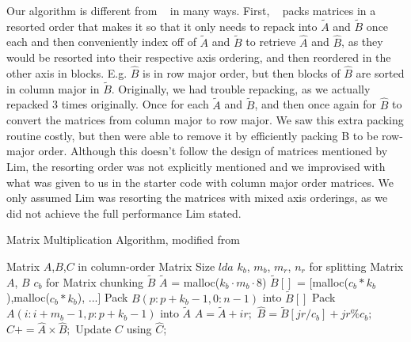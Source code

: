 \documentclass{article}
\begin{document}
Our algorithm is different from ~\cite{10.1007/s10586-018-2810-y} in many ways. First, ~\cite{10.1007/s10586-018-2810-y} packs matrices in a resorted order that makes it so that it only needs to repack into $\tilde{A}$ and $\tilde{B}$ once each and then conveniently index off of $\tilde{A}$ and $\tilde{B}$ to retrieve $\hat{A}$ and $\hat{B}$, as they would be resorted into their respective axis ordering, and then reordered in the other axis in blocks. E.g. $\hat{B}$ is in row major order, but then blocks of $\hat{B}$ are sorted in column major in $\tilde{B}$. Originally, we had trouble repacking, as we actually repacked 3 times originally. Once for each $\tilde{A}$ and $\tilde{B}$, and then once again for $\hat{B}$ to convert the matrices from column major to row major. We saw this extra packing routine costly, but then were able to remove it by efficiently packing B to be row-major order. Although this doesn't follow the design of matrices mentioned by Lim, the resorting order was not explicitly mentioned and we improvised with what was given to us in the starter code with column major order matrices. We only assumed Lim was resorting the matrices with mixed axis orderings, as we did not achieve the full performance Lim stated.

\begin{algorithm}[H]
\label{alg:algorithm1}
\caption{Matrix Multiplication Algorithm, modified from ~\cite{10.1007/s10586-018-2810-y}}
\begin{algorithmic}
    \REQUIRE Matrix $A$,$B$,$C$ in  column-order
    \REQUIRE Matrix Size $lda$
    \REQUIRE $k_b$, $m_b$, $m_r$, $n_r$ for splitting Matrix $A$, $B$ 
    \REQUIRE $c_b$ for Matrix chunking $\tilde{B}$
    \State $\tilde{A}$ = malloc($k_b \cdot m_b \cdot 8$)
    \State $\tilde{B}[]$ = [malloc($c_b * k_b$),malloc($c_b * k_b$), ...] 
        \State Pack $B(p : p + k_b - 1, 0: n - 1)$ into $\tilde{B}[]$ 
            \State Pack $A(i : i + m_b - 1, p: p + k_b - 1)$ into $\tilde{A}$ 
                    \State $\hat{A} = \tilde{A} + ir;$
                    \State $\hat{B} = \tilde{B}[jr/c_b] + jr\%c_b;$
                    \State $\hat{C} += \hat{A}\times\hat{B};$ 
                    \State Update $C$ using $\hat{C}$;
                \EndFor    
            \EndFor    
        \EndFor    
    \EndFor
\end{algorithmic}
\end{algorithm}
\end{document}
